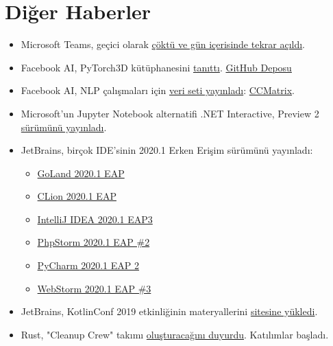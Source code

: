 \documentclass[11pt]{article}
\begin{document}
\section{Diğer Haberler}
\label{sec:orgc938ecf}
\begin{itemize}
\item Microsoft Teams, geçici olarak \href{https://techcrunch.com/2020/02/03/microsoft-teams-has-been-down-this-morning/}{çöktü ve gün içerisinde tekrar açıldı}.
\item Facebook AI, PyTorch3D kütüphanesini \href{https://ai.facebook.com/blog/-introducing-pytorch3d-an-open-source-library-for-3d-deep-learning/}{tanıttı}. \href{https://github.com/facebookresearch/pytorch3d}{GitHub Deposu}
\item Facebook AI, NLP çalışmaları için \href{https://ai.facebook.com/blog/ccmatrix-a-billion-scale-bitext-data-set-for-training-translation-models/}{veri seti yayınladı}: \href{https://github.com/facebookresearch/LASER/tree/master/tasks/CCMatrix}{CCMatrix}.
\item Microsoft'un Jupyter Notebook alternatifi .NET Interactive, Preview 2
\href{https://devblogs.microsoft.com/dotnet/net-interactive-is-here-net-notebooks-preview-2/}{sürümünü yayınladı}.
\item JetBrains, birçok IDE'sinin 2020.1 Erken Erişim sürümünü yayınladı:
\begin{itemize}
\item \href{https://blog.jetbrains.com/go/2020/02/06/welcome-to-the-goland-2020-1-eap/}{GoLand 2020.1 EAP}
\item \href{https://blog.jetbrains.com/clion/2020/02/clion-2020-1-eap-cuda-clang-win/}{CLion 2020.1 EAP}
\item \href{https://blog.jetbrains.com/idea/2020/02/intellij-idea-2020-1-eap3/}{IntelliJ IDEA 2020.1 EAP3}
\item \href{https://blog.jetbrains.com/phpstorm/2020/02/phpstorm-2020-1-eap-2/}{PhpStorm 2020.1 EAP \#2}
\item \href{https://blog.jetbrains.com/pycharm/2020/02/pycharm-2020-1-eap-2/}{PyCharm 2020.1 EAP 2}
\item \href{https://blog.jetbrains.com/webstorm/}{WebStorm 2020.1 EAP \#3}
\end{itemize}
\item JetBrains, KotlinConf 2019 etkinliğinin materyallerini \href{https://blog.jetbrains.com/kotlin/2020/02/kotlinconf-2019-materials-are-available-on-the-website/}{sitesine yükledi}.
\item Rust, "Cleanup Crew" takımı \href{https://blog.rust-lang.org/inside-rust/2020/02/06/Cleanup-Crew-ICE-breakers.html}{oluşturacağını duyurdu}. Katılımlar başladı.

\end{itemize}
\end{document}
